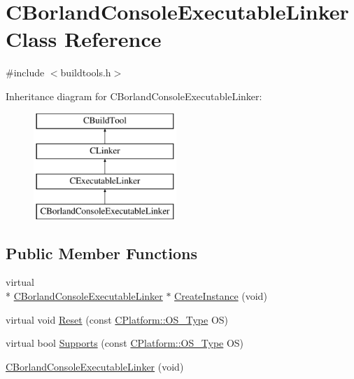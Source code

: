 \hypertarget{classCBorlandConsoleExecutableLinker}{\section{C\-Borland\-Console\-Executable\-Linker Class Reference}
\label{classCBorlandConsoleExecutableLinker}
}


{\ttfamily \#include $<$buildtools.\-h$>$}

Inheritance diagram for C\-Borland\-Console\-Executable\-Linker\-:\begin{figure}[H]
\begin{center}
\leavevmode
\includegraphics[height=4.000000cm]{d8/dbd/classCBorlandConsoleExecutableLinker}
\end{center}
\end{figure}
\subsection*{Public Member Functions}
\begin{DoxyCompactItemize}
\item 
virtual \\*
\hyperlink{classCBorlandConsoleExecutableLinker}{C\-Borland\-Console\-Executable\-Linker} $\ast$ \hyperlink{classCBorlandConsoleExecutableLinker_a1aba394784a724a2b59c021b732484f8}{Create\-Instance} (void)
\item 
virtual void \hyperlink{classCBorlandConsoleExecutableLinker_a0b31e3b17b2c03a4d6d6ada4fe8b48e0}{Reset} (const \hyperlink{classCPlatform_a2fb735c63c53052f79629e338bb0f535}{C\-Platform\-::\-O\-S\-\_\-\-Type} O\-S)
\item 
virtual bool \hyperlink{classCBorlandConsoleExecutableLinker_a3f6d2df3415c6ee0cec057b481378b45}{Supports} (const \hyperlink{classCPlatform_a2fb735c63c53052f79629e338bb0f535}{C\-Platform\-::\-O\-S\-\_\-\-Type} O\-S)
\item 
\hyperlink{classCBorlandConsoleExecutableLinker_a95ce52cd5ad5703509d75bb179b6e89e}{C\-Borland\-Console\-Executable\-Linker} (void)
\end{DoxyCompactItemize}
